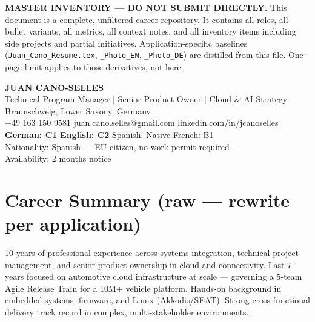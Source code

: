 \documentclass[10pt,a4paper]{article}
\begin{document}
\begin{noticebox}
\textbf{MASTER INVENTORY — DO NOT SUBMIT DIRECTLY.}
This document is a complete, unfiltered career repository. It contains all roles, all bullet variants,
all metrics, all context notes, and all inventory items including side projects and partial initiatives.
Application-specific baselines (\texttt{Juan\_Cano\_Resume.tex}, \texttt{\_Photo\_EN}, \texttt{\_Photo\_DE})
are distilled from this file. One-page limit applies to those derivatives, not here.
\end{noticebox}

\vspace{6pt}

{\LARGE\bfseries JUAN CANO-SELLES}\\[2pt]
{\normalsize Technical Program Manager $|$ Senior Product Owner $|$ Cloud \& AI Strategy}\\[4pt]
{\small
  Braunschweig, Lower Saxony, Germany\\
  +49 163 150 9581 \quad\textbar\quad
  \href{mailto:juan.cano.selles@gmail.com}{juan.cano.selles@gmail.com} \quad\textbar\quad
  \href{https://linkedin.com/in/jcanoselles}{linkedin.com/in/jcanoselles}\\[2pt]
  \textbf{German: C1} \quad\textbar\quad
  \textbf{English: C2} \quad\textbar\quad
  Spanish: Native \quad\textbar\quad French: B1\\[2pt]
  Nationality: Spanish — EU citizen, no work permit required\\
  Availability: 2 months notice
}

\section{Career Summary (raw — rewrite per application)}

10 years of professional experience across systems integration, technical project management, and
senior product ownership in cloud and connectivity. Last 7 years focused on automotive cloud
infrastructure at scale — governing a 5-team Agile Release Train for a 10M+ vehicle platform.
Hands-on background in embedded systems, firmware, and Linux (Akkodis/SEAT). Strong cross-functional
delivery track record in complex, multi-stakeholder environments.
\end{document}
